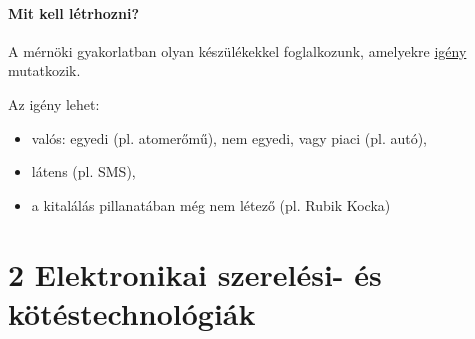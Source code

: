 \documentclass[12pt]{article}
\begin{document}
			\paragraph{Mit kell létrhozni?}

			A mérnöki gyakorlatban olyan készülékekkel foglalkozunk, amelyekre \underline{igény} mutatkozik.

			Az igény lehet:

			\begin{itemize}
				\item valós:
					\subitem egyedi (pl. atomerőmű),
					\subitem nem egyedi, vagy piaci (pl. autó), 
				\item látens (pl. SMS),
				\item a kitalálás pillanatában még nem létező (pl. Rubik Kocka)
			\end{itemize}















	\section{2 Elektronikai szerelési- és kötéstechnológiák}

			
\end{document}
